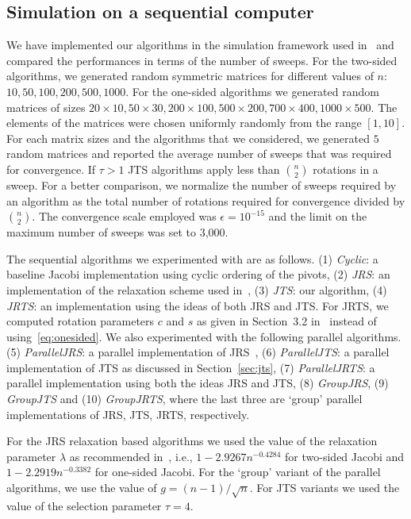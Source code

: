 \documentclass[10pt, conference, compsocconf]{IEEEtran}
\begin{document}
\subsection{Simulation on a sequential computer}

We have implemented our algorithms in the simulation framework used in~\cite{rajasekaran2008relaxation} and compared the performances in terms of the number
of sweeps. For the two-sided algorithms, we generated random symmetric matrices for different values of $n$: $10, 50, 100, 200, 500, 1000$. For the one-sided algorithms we generated random matrices of sizes $20 \times 10, 50 \times 30, 200 \times 100, 500 \times 200, 700 \times 400, 1000 \times 500$.  The elements of the matrices were chosen uniformly randomly from the range $[1,10]$. For each matrix sizes and the algorithms that we considered, we generated $5$ random matrices and reported the average number of sweeps that was required for convergence. If $\tau > 1$ JTS algorithms apply less than ${n \choose 2}$ rotations in a sweep. For a better comparison, we normalize the number of sweeps required by an algorithm as the total number of rotations required for convergence divided by ${n \choose 2}$. The convergence scale employed was $\epsilon = 10^{-15}$ and the limit on the maximum number of sweeps was set to 3,000.

The sequential algorithms we experimented with are as follows. (1) \emph{Cyclic}:  a baseline Jacobi implementation using cyclic ordering of the pivots, (2) \emph{JRS}: an implementation of the relaxation scheme used in~\cite{rajasekaran2008relaxation}, (3) \emph{JTS}: our algorithm, (4) \emph{JRTS}: an implementation using the ideas of both JRS and JTS. For JRTS, we computed rotation parameters $c$ and $s$ as given in Section~3.2 in~\cite{rajasekaran2008relaxation} instead of using~\eqref{eq:onesided}.  We also experimented with the following parallel algorithms. (5) \emph{ParallelJRS}: a parallel implementation of JRS~\cite{rajasekaran2008relaxation}, (6) \emph{ParallelJTS}: a parallel implementation of JTS as discussed in Section~\ref{sec:jts}, (7) \emph{ParallelJRTS}: a parallel implementation using both the ideas JRS and JTS, (8) \emph{GroupJRS}, (9) \emph{GroupJTS} and (10) \emph{GroupJRTS}, where the last three are `group' parallel implementations of JRS, JTS, JRTS, respectively.

For the JRS relaxation based algorithms we used the value of the relaxation parameter $\lambda$ as recommended in~\cite{rajasekaran2008relaxation}, i.e., $1- 2.9267n^{-0.4284}$ for two-sided Jacobi and $1 - 2.2919 n^{-0.3382}$ for one-sided Jacobi. For the `group' variant of the parallel algorithms, we use the value of $g = (n-1)/\sqrt{n}$. For JTS variants we used the value of the selection parameter $\tau=4$.
\end{document}
